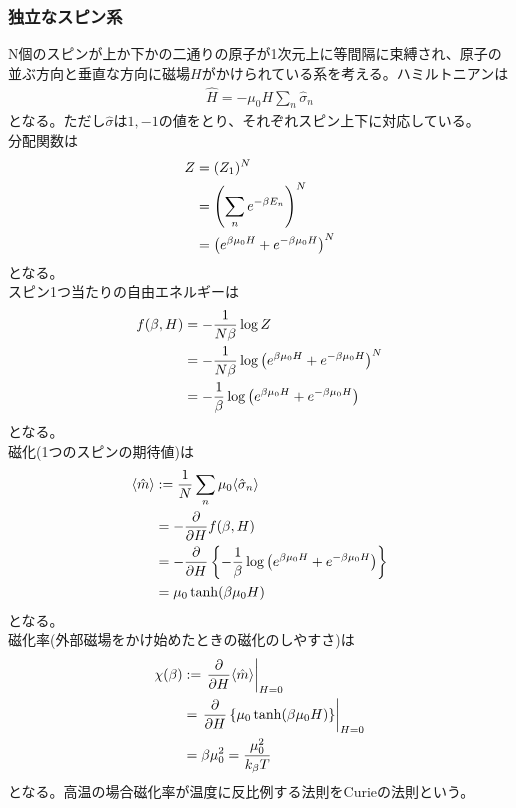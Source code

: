 \documentclass{jsarticle}  %
\numberwithin{equation}{section} %
\numberwithin{figure}{section}
\begin{document}
\subsubsection{独立なスピン系}
    N個のスピンが上か下かの二通りの原子が1次元上に等間隔に束縛され、原子の並ぶ方向と垂直な方向に磁場$H$がかけられている系を考える。ハミルトニアンは
    \begin{align}
        \hat{H} = - \mu_0 H \sum_n \hat{\sigma}_n
    \end{align}
    となる。ただし$\hat{\sigma}$は$1,-1$の値をとり、それぞれスピン上下に対応している。\\
    分配関数は
    \begin{align}
        Z &= (Z_1)^N \\
        &= \left( \sum_n e^{-\beta E_n} \right)^N \notag \\
        &= \left( e^{\beta \mu_0 H} + e^{-\beta \mu_0 H} \right)^N \notag 
    \end{align}
    となる。\\
    スピン1つ当たりの自由エネルギーは
    \begin{align}
        f(\beta,H) &= -\frac{1}{N\beta} \log Z \notag \\
        &= -\frac{1}{N\beta} \log \left( e^{\beta \mu_0 H} + e^{-\beta \mu_0 H} \right)^N \notag \\
        &= -\frac{1}{\beta} \log \left( e^{\beta \mu_0 H} + e^{-\beta \mu_0 H} \right) 
    \end{align}
    となる。\\
    磁化(1つのスピンの期待値)は
    \begin{align}
        \langle \hat{m} \rangle &:= \frac{1}{N} \sum_n \mu_0 \langle \hat{\sigma}_n \rangle \notag \\
        &= - \frac{\partial }{\partial H} f(\beta,H) \notag \\
        &= -\frac{\partial}{\partial H} \left\{ -\frac{1}{\beta} \log \left( e^{\beta \mu_0 H} + e^{-\beta \mu_0 H} \right)  \right\} \notag \\
        &= \mu_0 \tanh (\beta \mu_0 H)
    \end{align}
    となる。\\
    磁化率(外部磁場をかけ始めたときの磁化のしやすさ)は
    \begin{align}
        \chi(\beta) &:= \left. \frac{\partial }{\partial H } \langle \hat{m} \rangle \right|_{H=0} \notag \\
        &= \left. \frac{\partial }{\partial H } \left\{ \mu_0 \tanh (\beta \mu_0 H) \right\} \right|_{H=0} \notag \\
        &= \beta \mu_0^2 =\frac{\mu_0^2}{k_\beta T}
    \end{align}
    となる。高温の場合磁化率が温度に反比例する法則をCurieの法則という。
\end{document}
